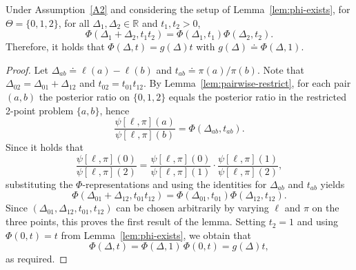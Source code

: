 \documentclass[10pt,a4paper]{amsart}
\begin{document}
\begin{lemma}
\label{lem:triple-multiplicative}
Under Assumption~\ref{A2} and considering the setup of Lemma~\ref{lem:phi-exists}, for $\Theta = \{0,1,2\}$, for all $\Delta_1, \Delta_2 \in \mathbb{R}$ and $t_1, t_2 > 0$,
\[
\Phi(\Delta_1 + \Delta_2, t_1 t_2) = \Phi(\Delta_1, t_1) \Phi(\Delta_2, t_2).
\]
Therefore, it holds that $\Phi(\Delta,t) = g(\Delta)t$ with $g(\Delta) \doteq \Phi(\Delta,1)$.
\end{lemma}

\begin{proof}
Let $\Delta_{ab} \doteq \ell(a) - \ell(b)$ and $t_{ab} \doteq \pi(a)/\pi(b)$. Note that $\Delta_{02} = \Delta_{01} + \Delta_{12}$ and $t_{02}=t_{01}t_{12}$. By Lemma~\ref{lem:pairwise-restrict}, for each pair $(a,b)$ the posterior ratio on $\{0,1,2\}$ equals the posterior ratio in the restricted 2-point problem $\{a,b\}$, hence
\[
\frac{\psi[\ell,\pi](a)}{\psi[\ell,\pi](b)} = \Phi(\Delta_{ab},t_{ab}).
\]
Since it holds that
\[
\frac{\psi[\ell,\pi](0)}{\psi[\ell,\pi](2)}
=
\frac{\psi[\ell,\pi](0)}{\psi[\ell,\pi](1)} \cdot \frac{\psi[\ell,\pi](1)}{\psi[\ell,\pi](2)},
\]
substituting the $\Phi$-representations and using the identities for $\Delta_{ab}$ and $t_{ab}$ yields
\[
\Phi(\Delta_{01}+\Delta_{12}, t_{01}t_{12}) = \Phi(\Delta_{01},t_{01}) \Phi(\Delta_{12},t_{12}).
\]
Since $(\Delta_{01},\Delta_{12},t_{01},t_{12})$ can be chosen arbitrarily by varying $\ell$ and $\pi$ on the three points, this proves the first result of the lemma. Setting $t_2 = 1$ and using $\Phi(0,t) = t$ from Lemma~\ref{lem:phi-exists}, we obtain that
\[
\Phi(\Delta,t) = \Phi(\Delta,1)\,\Phi(0,t) = g(\Delta)t,
\]
as required.
\end{proof}
\end{document}
